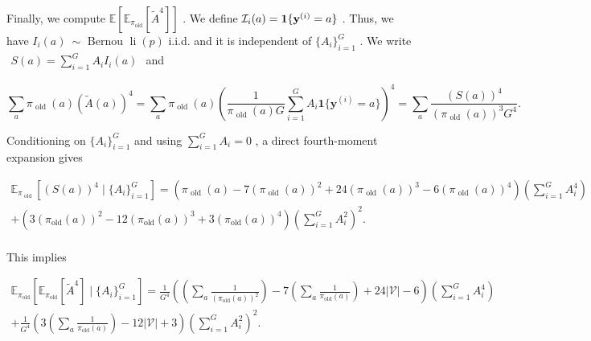 \documentclass[
  10
]{article}
\begin{document}
Finally, we compute
\(\mathbb { E } [ \mathbb { E } _ { \pi _ { \mathrm { o l d } } } [ \tilde { A } ^ { 4 } ] ]\)
. We define
\({ \cal I } _ { i } ( a ) = { \bf 1 } \{ { \bf y } ^ { ( i ) } = a \}\)
. Thus, we have \(I _ { i } ( a ) \ \sim\) Bernou
\(\operatorname { l i } ( p )\) i.i.d. and it is independent of
\(\{ A _ { i } \} _ { i = 1 } ^ { G }\) . We write
\(\begin{array} { r } { S ( { a } ) = \sum _ { i = 1 } ^ { G } A _ { i } I _ { i } ( { a } ) } \end{array}\)
and

\[
\sum_ {a} \pi_ {\text { old }} (a) (\tilde {A} (a)) ^ {4} = \sum_ {a} \pi_ {\text { old }} (a) \left(\frac {1}{\pi_ {\text { old }} (a) G} \sum_ {i = 1} ^ {G} A _ {i} \mathbf {1} \{\mathbf {y} ^ {(i)} = a \}\right) ^ {4} = \sum_ {a} \frac {(S (a)) ^ {4}}{(\pi_ {\text { old }} (a)) ^ {3} G ^ {4}}.
\]

Conditioning on \(\{ A _ { i } \} _ { i = 1 } ^ { G }\) and using
\(\textstyle \sum _ { i = 1 } ^ { G } A _ { i } = 0\) , a direct
fourth-moment expansion gives

\[
\begin{array}{l} \mathbb {E} _ {\pi_ {\text { old }}} \left[ (S (a)) ^ {4} \mid \{A _ {i} \} _ {i = 1} ^ {G} \right] = (\pi_ {\text { old }} (a) - 7 (\pi_ {\text { old }} (a)) ^ {2} + 2 4 (\pi_ {\text { old }} (a)) ^ {3} - 6 (\pi_ {\text { old }} (a)) ^ {4}) \left(\sum_ {i = 1} ^ {G} A _ {i} ^ {4}\right) \\ + (3 (\pi_ {\mathrm{old}} (a)) ^ {2} - 1 2 (\pi_ {\mathrm{old}} (a)) ^ {3} + 3 (\pi_ {\mathrm{old}} (a)) ^ {4}) \left(\sum_ {i = 1} ^ {G} A _ {i} ^ {2}\right) ^ {2}. \\ \end{array}
\]

This implies

\[
\begin{array}{l} \mathbb {E} _ {\pi_ {\text {old}}} \left[ \mathbb {E} _ {\pi_ {\text {old}}} [ \tilde {A} ^ {4} ] \mid \{A _ {i} \} _ {i = 1} ^ {G} \right] = \frac {1}{G ^ {4}} \left(\left(\sum_ {a} \frac {1}{(\pi_ {\text {old}} (a)) ^ {2}}\right) - 7 \left(\sum_ {a} \frac {1}{\pi_ {\text {old}} (a)}\right) + 2 4 | \mathcal {V} | - 6\right) \left(\sum_ {i = 1} ^ {G} A _ {i} ^ {4}\right) \\ + \frac {1}{G ^ {4}} \left(3 \left(\sum_ {a} \frac {1}{\pi_ {\mathrm{old}} (a)}\right) - 1 2 | \mathcal {V} | + 3\right) \left(\sum_ {i = 1} ^ {G} A _ {i} ^ {2}\right) ^ {2}. \\ \end{array}
\]
\end{document}
